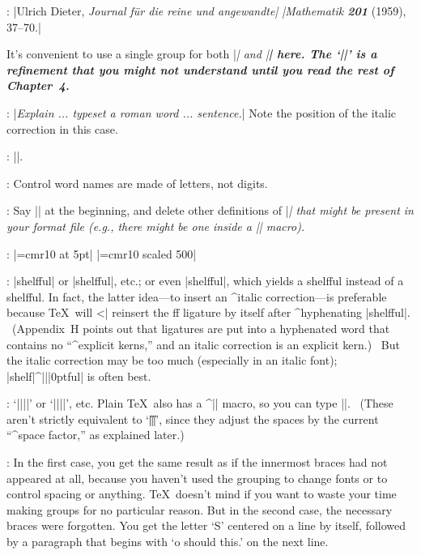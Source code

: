 :
 |Ulrich Dieter, {\sl Journal f\"ur die reine und angewandte|\parbreak
        |Mathematik\/ \bf201} (1959), 37--70.|\par\nobreak\smallskip\noindent
It's convenient to use a single group for both |\sl| and |\bf| here. The
`|\/|' is a refinement that you might not understand until you read the
rest of Chapter~4.

:
 |{\it Explain ... typeset a\/ {\rm roman} word ... sentence.}|
Note the position of the italic correction in this case.

:
 |\def\ic#1{\setbox0=\hbox{#1\/}\dimen0=\wd0|\parbreak
|\setbox0=\hbox{#1}\advance\dimen0 by -\wd0}|.

:
 Control word names are made of letters, not digits.

:
 Say |\def\sl{\it}| at the beginning, and delete other definitions
of\/ |\sl| that might be present in your format file (e.g., there might be
one inside a |\tenpoint| macro).

:
 |\font\squinttenrm=cmr10 at 5pt|\parbreak
        |\font\squinttenrm=cmr10 scaled 500|

:
 |{shelf}ful| or |shelf{}ful|, etc.; or even |shelf\/ful|, which
yields a shelf\/ful instead of a shelf{\kern0pt}ful.
In fact, the latter idea---to
insert an ^{italic correction}---is preferable because \TeX\ will ^^|\/|
reinsert the ff ligature by itself after ^{hyphenating} |shelf{}ful|. \
(Appendix~H points out that ligatures are put into a hyphenated word that
contains no ``^{explicit kerns},'' and an italic correction is an
explicit kern.) \ But the italic correction may be too much (especially in an
italic font); |shelf{|^|\kern||0pt}ful| is often best.

:
 `\]|{|\]|}|\]' or `\]|{}|\]|{}|\]', etc. Plain \TeX\ also has a
^|\space| macro, so you can type |\space\space\space|.  \ (These aren't
strictly equivalent to `|\|\]|\|\]|\|\]', since they adjust the spaces by
the current ``^{space factor},'' as explained later.)

:
 In the first case, you get the same result as if the innermost
braces had not appeared at all, because you haven't used the grouping to
change fonts or to control spacing or anything. \TeX\ doesn't mind if you
want to waste your time making groups for no particular reason.
But in the second case, the necessary braces were forgotten. You get the
letter `S' centered on a line by itself, followed by a paragraph that
begins with `o should this.' on the next line.

